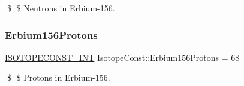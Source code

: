 \$ \$ Neutrons in Erbium-\/156. \mbox{\label{group___isotope_const-_erbium-_er156_ga94ef5383a1e9c975a37ecadfe323e41e}} 
\subsubsection{\texorpdfstring{Erbium156\+Protons}{Erbium156Protons}}
{\footnotesize\ttfamily \mbox{\hyperlink{group___isotope_const-_macros_ga5f18360b3e99483a35c32d789e62621c}{I\+S\+O\+T\+O\+P\+E\+C\+O\+N\+S\+T\+\_\+\+I\+NT}} Isotope\+Const\+::\+Erbium156\+Protons = 68}

\$ \$ Protons in Erbium-\/156. 